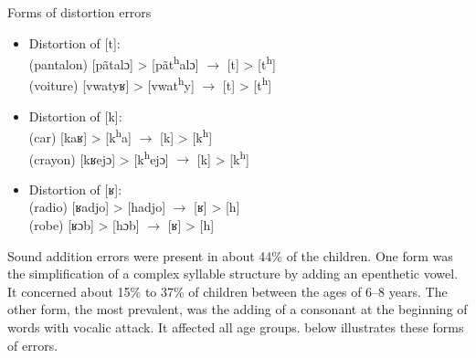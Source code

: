 \documentclass[output=paper,newtxmath,modfonts,nonflat,draftmode]{langsci/langscibook}
\begin{document}
\begin{exe}
\ex Forms of distortion errors \label{ex:takam:distortion_errors}
\begin{itemize}
\item Distortion of [t]:\\
(pantalon) [pãtalɔ] > [pãt\textsuperscript{h}alɔ] $\rightarrow$ [t] > [t\textsuperscript{h}]\\
(voiture) [vwatyʁ] > [vwat\textsuperscript{h}y] $\rightarrow$ [t] > [t\textsuperscript{h}]\\

\item Distortion of [k]:\\ 
(car) [kaʁ] > [k\textsuperscript{h}a] $\rightarrow$ [k] > [k\textsuperscript{h}]\\
(crayon) [kʁejɔ] > [k\textsuperscript{h}ejɔ] $\rightarrow$ [k] > [k\textsuperscript{h}]\\
\item Distortion of [ʁ]:\\
(radio) [ʁadjo] > [hadjo] $\rightarrow$ [ʁ] > [h]\\
(robe) [ʁɔb] > [hɔb] $\rightarrow$ [ʁ] > [h] \\
\end{itemize}
\end{exe}



Sound addition errors were present in about 44\% of the children. One form was the simplification of a complex syllable structure by adding an epenthetic vowel. It concerned about 15\% to 37\% of children between the ages of 6--8 years. The other form, the most prevalent, was the adding of a consonant at the beginning of words with vocalic attack. It affected all age groups.  below illustrates these forms of errors.
\end{document}
